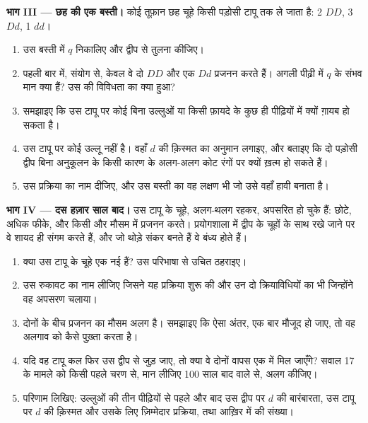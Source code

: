 \begin{problem}
\medskip
\noindent\textbf{भाग III --- छह की एक बस्ती।}
कोई तूफ़ान छह चूहे किसी पड़ोसी टापू तक ले जाता है: 2 $DD$, 3 $Dd$, 1 $dd$।
\begin{enumerate}[resume]
  \item उस बस्ती में $q$ निकालिए और द्वीप से तुलना कीजिए।
  \item पहली बार में, संयोग से, केवल वे दो $DD$ और एक $Dd$ प्रजनन करते
        हैं। अगली पीढ़ी में $q$ के संभव मान क्या हैं? उस  की विविधता
        का क्या हुआ?
  \item समझाइए कि उस टापू पर कोई  बिना उल्लुओं या किसी फ़ायदे
        के कुछ ही पीढ़ियों में क्यों ग़ायब हो सकता है।
  \item उस टापू पर कोई उल्लू नहीं है। वहाँ $d$ की क़िस्मत का अनुमान
        लगाइए, और बताइए कि दो पड़ोसी द्वीप बिना अनुकूलन के किसी कारण के
        अलग-अलग कोट रंगों पर क्यों ख़त्म हो सकते हैं।
  \item उस प्रक्रिया का नाम दीजिए, और उस बस्ती का वह लक्षण भी जो उसे वहाँ
        हावी बनाता है।
\end{enumerate}

\medskip
\noindent\textbf{भाग IV --- दस हज़ार साल बाद।}
उस टापू के चूहे, अलग-थलग रहकर, अपसरित हो चुके हैं: छोटे, अधिक फीके, और किसी
और मौसम में प्रजनन करते। प्रयोगशाला में द्वीप के चूहों के साथ रखे जाने पर
वे शायद ही संगम करते हैं, और जो थोड़े संकर बनते हैं वे बंध्य होते हैं।
\begin{enumerate}[resume]
  \item क्या उस टापू के चूहे एक नई  हैं? उस परिभाषा से उचित ठहराइए।
  \item उस रुकावट का नाम लीजिए जिसने यह प्रक्रिया शुरू की और उन दो
        क्रियाविधियों का भी जिन्होंने वह अपसरण चलाया।
  \item दोनों के बीच प्रजनन का मौसम अलग है। समझाइए कि ऐसा अंतर, एक बार
        मौजूद हो जाए, तो वह अलगाव को कैसे पुख़्ता करता है।
  \item यदि वह टापू कल फिर उस द्वीप से जुड़ जाए, तो क्या वे दोनों वापस एक
         में मिल जाएँगे? सवाल 17 के मामले को किसी पहले चरण से, मान
        लीजिए 100 साल बाद वाले से, अलग कीजिए।
  \item परिणाम लिखिए: उल्लुओं की तीन पीढ़ियों से पहले और बाद उस द्वीप पर
        $d$ की बारंबारता, उस टापू पर $d$ की क़िस्मत और उसके लिए ज़िम्मेदार
        प्रक्रिया, तथा आख़िर में  की संख्या।
\end{enumerate}
\end{problem}
